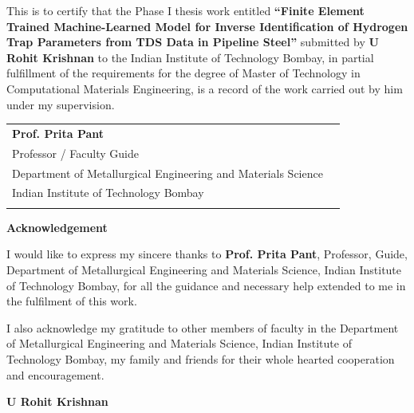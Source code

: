 \documentclass[a4paper,12pt,oneside]{report}
\begin{document}
This is to certify that the Phase I thesis work entitled
\textbf{``Finite Element Trained Machine-Learned Model for Inverse Identification of Hydrogen Trap Parameters from TDS Data in Pipeline Steel''}
submitted by
\textbf{U Rohit Krishnan}
to the Indian Institute of Technology Bombay, in partial fulfillment of the requirements for the degree of Master of Technology in Computational Materials Engineering, is a record of the work carried out by him under my supervision.

\vspace{2cm}

\begin{center}

\begin{tabular}{p{7cm} p{7cm}}

\textbf{Prof. Prita Pant} &
\\
Professor / Faculty Guide &
\\
Department of Metallurgical Engineering and Materials Science &
\\
Indian Institute of Technology Bombay &
\\
&

\end{tabular}

\end{center}


\newpage

\thispagestyle{empty}

\begin{center}
{\Large\bf Acknowledgement}
\end{center}

I would like to express my sincere thanks to \textbf{Prof. Prita Pant}, Professor, Guide, Department of Metallurgical Engineering and Materials Science, Indian Institute of Technology Bombay, for all the guidance and necessary help extended to me in the fulfilment of this work.

I also acknowledge my gratitude to other members of faculty in the Department of Metallurgical Engineering and Materials Science, Indian Institute of Technology Bombay, my family and friends for their whole hearted cooperation and encouragement.

\vspace*{1cm}

\hspace{9cm}
\textbf{U Rohit Krishnan}
\end{document}
